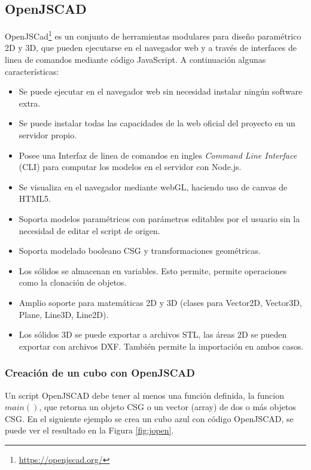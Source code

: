 \subsection{OpenJSCAD}

OpenJSCad\footnote{\url{https://openjscad.org/}}
es un conjunto de herramientas modulares para diseño paramétrico 2D y 3D, que pueden ejecutarse en el navegador web y a través de interfaces de linea de comandos mediante código JavaScript. A continuación algunas características:

\begin{itemize}
    \item Se puede ejecutar en el navegador web sin necesidad instalar ningún software extra.
    \item Se puede instalar todas las capacidades de la web oficial del proyecto en un servidor propio.
    \item Posee una Interfaz de linea de comandos en ingles \textit{Command Line Interface} (CLI) para computar los modelos en el servidor con Node.js.
    \item Se visualiza en el navegador mediante webGL, haciendo uso de canvas de HTML5.
    \item Soporta modelos paramétricos con parámetros editables por el usuario sin la necesidad de editar el script de origen.
    \item Soporta modelado booleano CSG y transformaciones geométricas.
    \item Los sólidos se almacenan en variables. Esto permite, permite operaciones como la clonación de objetos.
    \item Amplio soporte para matemáticas 2D y 3D (clases para Vector2D, Vector3D, Plane, Line3D, Line2D).
    \item Los sólidos 3D se puede exportar a archivos STL, las áreas 2D se pueden exportar con archivos DXF. También permite la importación en ambos casos.
\end{itemize}

\subsubsection{Creación de un cubo con OpenJSCAD}

Un script OpenJSCAD debe tener al menos una función definida, la funcion $main()$, que retorna un objeto CSG o un vector (array) de dos o más objetos CSG. En el siguiente ejemplo se crea un cubo azul con código OpenJSCAD, se puede ver el resultado en la Figura \ref{fig:jopen}. 

